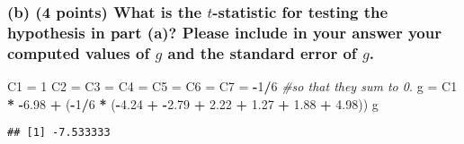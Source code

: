 \documentclass[]{article}
\newenvironment{Shaded}{\begin{snugshade}}{\end{snugshade}}
\newcommand{\DecValTok}[1]{\textcolor[rgb]{0.00,0.00,0.81}{#1}}
\newcommand{\FloatTok}[1]{\textcolor[rgb]{0.00,0.00,0.81}{#1}}
\newcommand{\StringTok}[1]{\textcolor[rgb]{0.31,0.60,0.02}{#1}}
\newcommand{\CommentTok}[1]{\textcolor[rgb]{0.56,0.35,0.01}{\textit{#1}}}
\newcommand{\OperatorTok}[1]{\textcolor[rgb]{0.81,0.36,0.00}{\textbf{#1}}}
\newcommand{\NormalTok}[1]{#1}
\begin{document}
\subsubsection{\texorpdfstring{(b) (4 points) What is the
\(t\)-statistic for testing the hypothesis in part (a)? Please include
in your answer your computed values of \(g\) and the standard error of
\(g\).}{(b) (4 points) What is the t-statistic for testing the hypothesis in part (a)? Please include in your answer your computed values of g and the standard error of g.}}\label{b-4-points-what-is-the-t-statistic-for-testing-the-hypothesis-in-part-a-please-include-in-your-answer-your-computed-values-of-g-and-the-standard-error-of-g.}

\begin{Shaded}
\begin{Highlighting}[]
\NormalTok{C1 =}\StringTok{ }\DecValTok{1}
\NormalTok{C2 =}\StringTok{ }\NormalTok{C3 =}\StringTok{ }\NormalTok{C4 =}\StringTok{ }\NormalTok{C5 =}\StringTok{ }\NormalTok{C6 =}\StringTok{ }\NormalTok{C7 =}\StringTok{ }\OperatorTok{-}\DecValTok{1}\OperatorTok{/}\DecValTok{6} \CommentTok{#so that they sum to 0.}
\NormalTok{g =}\StringTok{ }\NormalTok{C1 }\OperatorTok{*}\StringTok{ }\OperatorTok{-}\FloatTok{6.98} \OperatorTok{+}\StringTok{ }\NormalTok{(}\OperatorTok{-}\DecValTok{1}\OperatorTok{/}\DecValTok{6} \OperatorTok{*}\StringTok{ }\NormalTok{(}\OperatorTok{-}\FloatTok{4.24} \OperatorTok{+}\StringTok{ }\OperatorTok{-}\FloatTok{2.79} \OperatorTok{+}\StringTok{ }\FloatTok{2.22} \OperatorTok{+}\StringTok{ }\FloatTok{1.27} \OperatorTok{+}\StringTok{ }\FloatTok{1.88} \OperatorTok{+}\StringTok{ }\FloatTok{4.98}\NormalTok{))}
\NormalTok{g}
\end{Highlighting}
\end{Shaded}

\begin{verbatim}
## [1] -7.533333
\end{verbatim}
\end{document}

